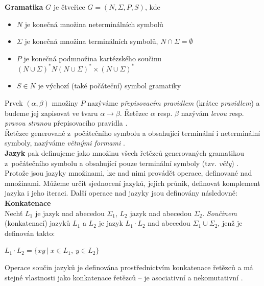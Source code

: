 \textbf{Gramatika} $G$ je čtveřice $G = (N, \Sigma, P, S)$, kde
\begin{itemize}
\item $N$ je konečná množina neterminálních symbolů
\item $\Sigma$ je konečná množina terminálních symbolů, $N \cap \Sigma = \emptyset$
\item $P$ je konečná podmnožina kartézského součinu $(N\cup\Sigma)^*N(N\cup\Sigma)^*\times(N\cup\Sigma)^*$
\item $S \in N$ je výchozí (také počáteční) symbol gramatiky
\end{itemize}
\vspace*{\baselineskip}
Prvek $(\alpha, \beta)$ množiny $P$ nazýváme \textit{přepisovacím pravidlem} (krátce \textit{pravidlem}) a budeme jej zapisovat 
ve tvaru $\alpha \rightarrow \beta$. Řetězec $\alpha$ resp. $\beta$ nazývám \textit{levou} resp. \textit{pravou stranou} přepisovacího 
pravidla \cite[str. 13]{TIN2013}. \\

Řetězce generované z~počátečního symbolu a obsahující terminální i neterminální symboly, nazýváme \textit{větnými formami} \cite[str. 15]{TIN2013}. \\

\textbf{Jazyk} pak definujeme jako množinu všech řetězců generovaných gramatikou z~počátečního symbolu a obsahující pouze terminální symboly 
(tzv. \textit{věty}) \cite[str. 15]{TIN2013}. \\

Protože jsou jazyky množinami, lze nad nimi provádět operace, definované nad množinami.
Můžeme určit sjednocení jazyků, jejich průnik, definovat komplement jazyka i jeho iteraci. Další operace nad jazyky jsou definovány následovně: \\

\textbf{Konkatenace} \\
Nechť $L_1$ je jazyk nad abecedou $\Sigma_1$, $L_2$ jazyk nad abecedou $\Sigma_2$. \textit{Součinem} (konkatenací) jazyků 
$L_1$ a $L_2$ je jazyk $L_1 \cdot L_2$ nad abecedou $\Sigma_1 \cup \Sigma_2$, jenž je definován takto:
\begin{center}
$L_1 \cdot L_2 = \{xy \ | \ x \in L_1, \ y \in L_2\}$
\end{center}
Operace součin jazyků je definována prostřednictvím konkatenace řetězců a má stejné vlastnosti jako konkatenace řetězců -- je asociativní 
a nekomutativní \cite[str. 10]{TIN2013}. \\

